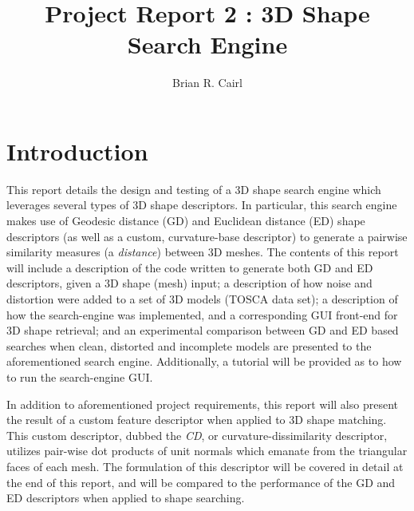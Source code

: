 \documentclass[12pt]{article}
\title{Project Report 2 : 3D Shape Search Engine}
\author{Brian R. Cairl}
\begin{document}
\maketitle
\pagebreak

\newcommand{\ith}{i$^{th}$\hspace{0.5mm}}
\newcommand{\jth}{j$^{th}$\hspace{0.5mm}}
\newcommand{\kth}{j$^{th}$\hspace{0.5mm}}
\newcommand{\st}{\hspace{0.5mm}:\hspace{0.5mm}}
\newcommand{\fa}{\hspace{0.5mm}\forall\hspace{0.5mm}}


\section*{Introduction}

	\noindent	
	This report details the design and testing of a 3D shape search engine which leverages several types of 3D shape descriptors. In particular, this search engine makes use of Geodesic distance (GD) and Euclidean distance (ED) shape descriptors (as well as a custom, curvature-base descriptor) to generate a pairwise similarity measures (a \emph{distance}) between 3D meshes. The contents of this report will include a description of the code written to generate both GD and ED descriptors, given a 3D shape (mesh) input; a description of how noise and distortion were added to a set of 3D models (TOSCA data set); a description of how the search-engine was implemented, and a corresponding GUI front-end for 3D shape retrieval; and an experimental comparison between GD and ED based searches when clean, distorted and incomplete models are presented to the aforementioned search engine. Additionally, a tutorial will be provided as to how to run the search-engine GUI.

	\noindent	
	In addition to aforementioned project requirements, this report will also present the result of a custom feature descriptor when applied to 3D shape matching. This custom descriptor, dubbed the \emph{CD}, or curvature-dissimilarity descriptor, utilizes pair-wise dot products of unit normals which emanate from the triangular faces of each mesh. The formulation of this descriptor will be covered in detail at the end of this report, and will be compared to the performance of the GD and ED descriptors when applied to shape searching.
\end{document}
